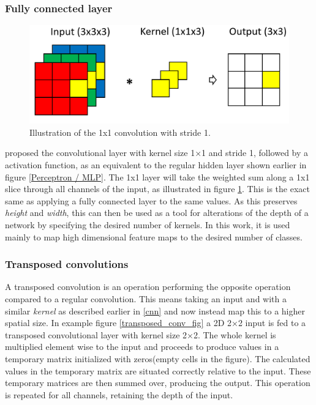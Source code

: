 \subsubsection{Fully connected layer}
    \begin{figure}[H]
        \centering
        \includegraphics[scale=0.35]{figures/1x1.png}
        \caption[1x1 convolution]{Illustration of the 1x1 convolution with stride 1.}
      	\medskip 
        \label{1x1_fig}
    \end{figure}
    \citeauthor{lin2013network_in_network_1x1}\cite{lin2013network_in_network_1x1} proposed the convolutional layer with kernel size 1×1 and stride 1, followed by a activation function, as an equivalent to the regular hidden layer shown earlier in figure \ref{Perceptron / MLP}\cite{lin2013network_in_network_1x1}. The 1x1 layer will take the weighted sum along a 1x1 slice through all channels of the input, as illustrated in figure \ref{1x1_fig}. This is the exact same as applying a fully connected layer to the same values. As this preserves \textit{height} and \textit{width}, this can then be used as a tool for alterations of the depth of a network by specifying the desired number of kernels. In this work, it is used mainly to map high dimensional feature maps to the desired number of classes.
    
    

\subsubsection{Transposed convolutions}
    A transposed convolution is an operation performing the opposite operation compared to a regular convolution\cite{dumoulin2016guide_transposed_convolution}. This means taking an input and with a similar \textit{kernel} as described earlier in \ref{cnn} and now instead map this to a higher spatial size. In example figure \ref{transposed_conv_fig} a 2D 2×2 input is fed to a transposed convolutional layer with kernel size 2×2. The whole kernel is multiplied element wise to the input and proceeds to produce values in a temporary matrix initialized with zeros(empty cells in the figure). The calculated values in the temporary matrix are situated correctly relative to the input. These temporary matrices are then summed over, producing the output. This operation is repeated for all channels, retaining the depth of the input. 
    
